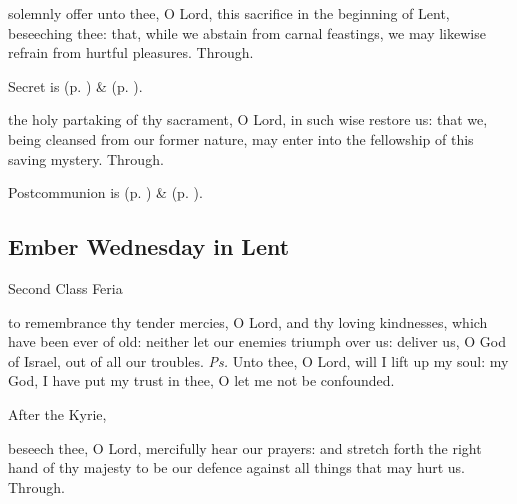 \secret
{} solemnly offer unto thee, O Lord, this sacrifice in the beginning of Lent, beseeching thee: that, while we abstain from carnal feastings, we may likewise refrain from hurtful pleasures. Through.
\begin{rubric}
     Secret is  (p. \pageref{SPSaints}) \&   (p. \pageref{SPLivingDeparted}).
\end{rubric}
\postcommunion
{} the holy partaking of thy sacrament, O Lord, in such wise restore us: that we, being cleansed from our former nature, may enter into the fellowship of this saving mystery. Through.
\begin{rubric}
     Postcommunion is  (p. \pageref{SPSaints}) \&   (p. \pageref{SPLivingDeparted}).
\end{rubric}

\subsection{Ember Wednesday in Lent}
\begin{inhead}
{Second Class Feria}
\end{inhead}


\introit
{} to remembrance thy tender mercies, O Lord, and thy loving kindnesses, which have been ever of old: neither let our enemies triumph over us: deliver us, O God of Israel, out of all our troubles. \textit{Ps.} Unto thee, O Lord, will I lift up my soul: my God, I have put my trust in thee, O let me not be confounded.

\begin{rubric}
    After the Kyrie,
\end{rubric}

\collect
{} beseech thee, O Lord, mercifully hear our prayers: and stretch forth the right hand of thy majesty to be our defence against all things that may hurt us. Through.

